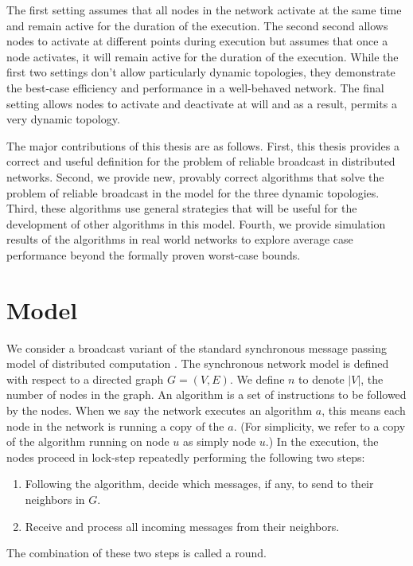 \documentclass[english]{article}
\begin{document}
The first setting assumes that all nodes in the network activate at the same time and remain active for the duration of the execution. The second second allows nodes to activate at different points during execution but assumes that once a node activates, it will remain active for the duration of the execution. While the first two settings don't allow particularly dynamic topologies, they demonstrate the best-case efficiency and performance in a well-behaved network. The final setting allows nodes to activate and deactivate at will and as a result, permits a very dynamic topology. 

The major contributions of this thesis are as follows. First, this thesis provides a correct and useful definition for the problem of reliable broadcast in distributed networks. Second, we provide new, provably correct algorithms that solve the problem of reliable broadcast in the model for the three dynamic topologies. Third, these algorithms use general strategies that will be useful for the development of other algorithms in this model. Fourth, we provide simulation results of the algorithms in real world networks to explore average case performance beyond the formally proven worst-case bounds.

\section{Model}

We consider a broadcast variant of the standard synchronous message passing model of distributed computation \cite{Lynch:1996, Kuhn:2010}. The synchronous network model is defined with respect to a directed graph $G=(V,E)$. We define $n$ to denote $|V|$, the number of nodes in the graph. An algorithm is a set of instructions to be followed by the nodes. When we say the network executes an algorithm $a$, this means each node in the network is running a copy of the $a$. (For simplicity, we refer to a copy of the algorithm running on node $u$ as simply node $u$.) In the execution, the nodes proceed in lock-step repeatedly performing the following two steps:
\begin{enumerate}
  \item Following the algorithm, decide which messages, if any, to send to their neighbors in $G$.
  \item Receive and process all incoming messages from their neighbors.
\end{enumerate}
The combination of these two steps is called a round.
\end{document}
